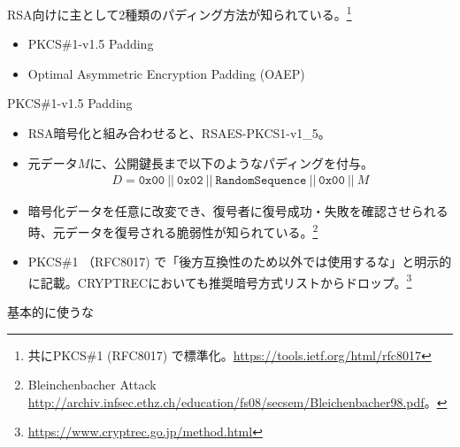 \documentclass[12pt,dvipdfmx]{beamer}
\begin{document}
\begin{frame}

RSA向けに主として2種類のパディング方法が知られている。\footnote[frame]{\scriptsize 共にPKCS\#1 (RFC8017) で標準化。\url{https://tools.ietf.org/html/rfc8017}}

\begin{itemize}
 \item PKCS\#1-v1.5 Padding
 \item Optimal Asymmetric Encryption Padding (OAEP)
\end{itemize}

\end{frame}


\begin{frame}

\begin{block}{\small PKCS\#1-v1.5 Padding}
\small
\begin{itemize}
 \item RSA暗号化と組み合わせると、RSAES-PKCS1-v1\_5。
 \item 元データ$M$に、公開鍵長まで以下のようなパディングを付与。
\begin{align*}
 D = \mathtt{0x00}\ ||\ \mathtt{0x02}\ ||\ \texttt{RandomSequence}\ ||\ \mathtt{0x00}\ ||\ M
\end{align*}
 \item 暗号化データを任意に改変でき、復号者に復号成功・失敗を確認させられる時、\alert{元データを復号される脆弱性}が知られている。\footnote[frame]{\scriptsize Bleinchenbacher Attack \url{http://archiv.infsec.ethz.ch/education/fs08/secsem/Bleichenbacher98.pdf}。}
 \item PKCS\#1 （RFC8017) で「後方互換性のため以外では使用するな」と明示的に記載。CRYPTRECにおいても推奨暗号方式リストからドロップ。\footnote[frame]{\scriptsize \url{https://www.cryptrec.go.jp/method.html}}
\end{itemize}
\end{block}

\begin{center}
 {\Large \alert{基本的に使うな}}
\end{center}
\end{frame}
\end{document}
